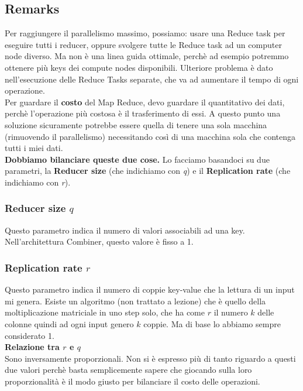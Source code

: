 \subsection{Remarks}
Per raggiungere il parallelismo massimo, possiamo: usare una Reduce task per eseguire tutti i reducer, oppure svolgere tutte le Reduce task ad un computer node diverso. Ma non è una linea guida ottimale, perchè ad esempio potremmo ottenere più keys dei compute nodes disponibili. Ulteriore problema è dato nell'esecuzione delle Reduce Tasks separate, che va ad aumentare il tempo di ogni operazione. 
\\
Per guardare il \textbf{costo} del Map Reduce, devo guardare il quantitativo dei dati, perchè l'operazione più costosa è il trasferimento di essi. A questo punto una soluzione sicuramente potrebbe essere quella di tenere una sola macchina (rimuovendo il parallelismo) necessitando così di una macchina sola che contenga tutti i miei dati. 
\\
\textbf{Dobbiamo bilanciare queste due cose.} Lo facciamo basandoci su due parametri, la \textbf{Reducer size} (che indichiamo con \textit{q}) e il \textbf{Replication rate} (che indichiamo con \textit{r}).
\subsubsection{Reducer size $q$}
Questo parametro indica il numero di valori associabili ad una key. Nell'architettura Combiner, questo valore è fisso a 1.
\subsubsection{Replication rate $r$}
Questo parametro indica il numero di coppie key-value che la lettura di un input mi genera. Esiste un algoritmo (non trattato a lezione) che è quello della moltiplicazione matriciale in uno step solo, che ha come $r$ il numero $k$ delle colonne quindi ad ogni input genero $k$ coppie. Ma di base lo abbiamo sempre considerato 1. 
\\[2ex]
\textbf{\large{Relazione tra $r$ e $q$}}
\\[2ex]
Sono inversamente proporzionali. Non si è espresso più di tanto riguardo a questi due valori perchè basta semplicemente sapere che giocando sulla loro proporzionalità è il modo giusto per bilanciare il costo delle operazioni. 
